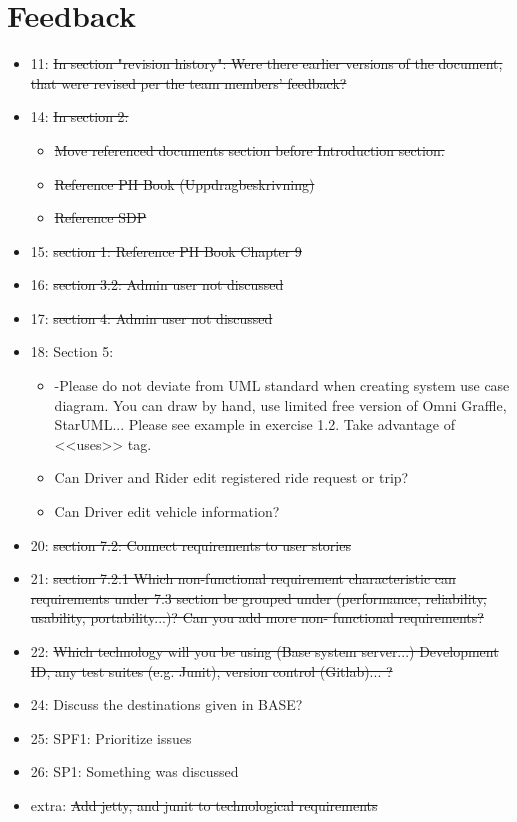\documentclass{article}
\begin{document}
\section*{Feedback}
\begin{itemize}
    \item 11: \sout{In section "revision history": Were there earlier versions of the document, that were revised per the team members' feedback?}
    \item 14: \sout{In section 2:}
    \begin{itemize}
        \item \sout{Move referenced documents section before Introduction section.}
        \item \sout{Reference PH Book (Uppdragbeskrivning)}
        \item \sout{Reference SDP}
    \end{itemize}
    \item 15: \sout{section 1: Reference PH Book Chapter 9}
    \item 16: \sout{section 3.2: Admin user not discussed}
    \item 17: \sout{section 4: Admin user not discussed}
    \item 18: Section 5:
    \begin{itemize}
        \item -Please do not deviate from UML standard when creating system use case diagram. You can draw by hand, use limited free version of Omni Graffle, StarUML... Please see example in exercise 1.2. Take advantage of <<uses>> tag.
        \item Can Driver and Rider edit registered ride request or trip?
        \item Can Driver edit vehicle information?
    \end{itemize}
    \item 20: \sout{section 7.2: Connect requirements to user stories}
    \item 21: \sout{section 7.2.1 Which non-functional requirement characteristic can requirements under 7.3 section be grouped under (performance, reliability, usability, portability...)? Can you add more non- functional requirements?}
    \item 22: \sout{Which technology will you be using (Base system server...) Development ID, any test suites (e.g. Junit), version control (Gitlab)... ?}
    \item 24: Discuss the destinations given in BASE?
    \item 25: SPF1: Prioritize issues
    \item 26: SP1: Something was discussed
    \item extra: \sout{Add jetty, and junit to technological requirements}
\end{itemize}
\end{document}
